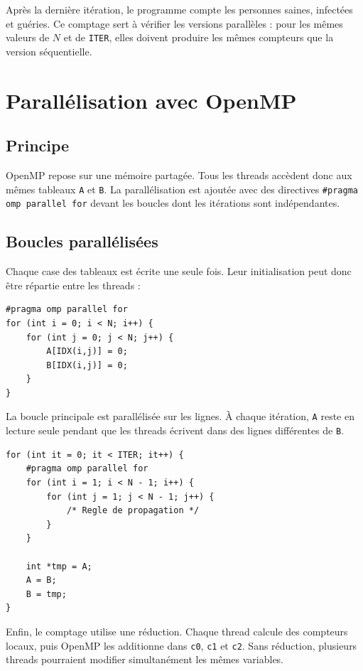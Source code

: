 \documentclass[a4paper,12pt]{article}
\begin{document}
Après la dernière itération, le programme compte les personnes saines,
infectées et guéries. Ce comptage sert à vérifier les versions parallèles :
pour les mêmes valeurs de $N$ et de \texttt{ITER}, elles doivent produire les
mêmes compteurs que la version séquentielle.

\section{Parallélisation avec OpenMP}

\subsection{Principe}

OpenMP repose sur une mémoire partagée. Tous les threads accèdent donc aux
mêmes tableaux \texttt{A} et \texttt{B}. La parallélisation est ajoutée avec
des directives \texttt{\#pragma omp parallel for} devant les boucles dont les
itérations sont indépendantes.

\subsection{Boucles parallélisées}

Chaque case des tableaux est écrite une seule fois. Leur initialisation peut
donc être répartie entre les threads :

\begin{lstlisting}
#pragma omp parallel for
for (int i = 0; i < N; i++) {
    for (int j = 0; j < N; j++) {
        A[IDX(i,j)] = 0;
        B[IDX(i,j)] = 0;
    }
}
\end{lstlisting}

La boucle principale est parallélisée sur les lignes. À chaque itération,
\texttt{A} reste en lecture seule pendant que les threads écrivent dans des
lignes différentes de \texttt{B}.

\begin{lstlisting}
for (int it = 0; it < ITER; it++) {
    #pragma omp parallel for
    for (int i = 1; i < N - 1; i++) {
        for (int j = 1; j < N - 1; j++) {
            /* Regle de propagation */
        }
    }

    int *tmp = A;
    A = B;
    B = tmp;
}
\end{lstlisting}

Enfin, le comptage utilise une réduction. Chaque thread calcule des compteurs
locaux, puis OpenMP les additionne dans \texttt{c0}, \texttt{c1} et
\texttt{c2}. Sans réduction, plusieurs threads pourraient modifier
simultanément les mêmes variables.
\end{document}
